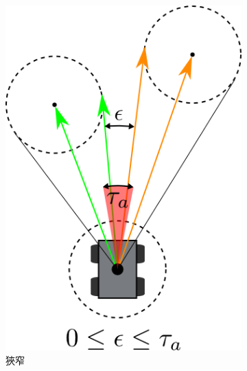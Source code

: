 \begin{figure}[h!]
\begin{subfigure}[t]{0.3\textwidth}
		\includegraphics[width=\textwidth]{figures/algorithm/epsilon_situation_2}
		\caption{狹窄}
		\label{f:epsilon_2}
	\end{subfigure}
	\begin{subfigure}[t]{0.4\textwidth}

\end{subfigure}
\end{figure}
